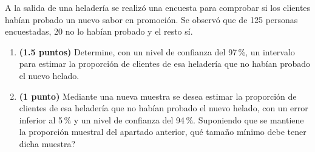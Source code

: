 
A la salida de una heladería se realizó una encuesta para comprobar si los
clientes habían probado un nuevo sabor en promoción. Se observó que de 125
personas encuestadas, 20 no lo habían probado y el resto sí.

\begin{enumerate}[label=\alph*)]
  \item \textbf{(1.5 puntos)} Determine, con un nivel de confianza del
  97\,\%, un intervalo para estimar la proporción de clientes de esa
  heladería que no habían probado el nuevo helado.
  \item \textbf{(1 punto)} Mediante una nueva muestra se desea estimar la
  proporción de clientes de esa heladería que no habían probado el nuevo
  helado, con un error inferior al 5\,\% y un nivel de confianza del
  94\,\%. Suponiendo que se mantiene la proporción muestral del apartado
  anterior, \textquestiondown{}qué tamaño mínimo debe tener dicha muestra?
\end{enumerate}
